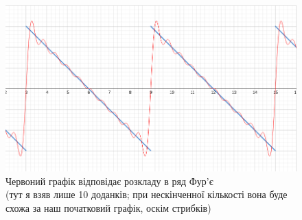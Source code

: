 \documentclass[a4paper, 14pt]{extarticle}
\def\hugespace{\vspace{5mm} \\}
\begin{document}
	\begin{figure}[h]
	\captionsetup{justification=centering}
	\centerline{\includegraphics[scale = 0.6]{FourierExpansion.png}}	
	\caption{Червоний графік відповідає розкладу в ряд Фур'є \\ (тут я взяв лише 10 доданків; при нескінченної кількості вона буде схожа за наш початковий графік, оскім стрибків)}
	\end{figure}
\hugespace
\end{document}
